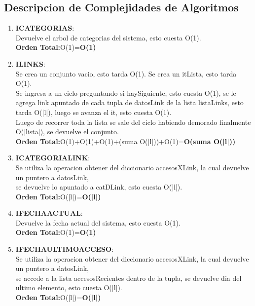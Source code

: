 \documentclass[10pt, a4paper]{article}
\begin{document}
\subsection{\huge Descripcion de Complejidades de Algoritmos}	
  
    \begin{enumerate}
     \item \textbf{ICATEGORIAS}: \\ Devuelve el arbol de categorias del sistema, esto cuesta O(1). \\
      \textbf{Orden Total:}O(1)=\textbf{O(1)}

     \item \textbf{ILINKS}:\\ Se crea un conjunto vacio, esto tarda O(1). Se crea un itLista, esto tarda O(1). \\ Se ingresa a un ciclo preguntando si haySiguiente, esto cuesta O(1), se le agrega link apuntado de cada tupla de datosLink de la lista listaLinks, esto tarda O(|l|), luego se avanza el it, esto cuesta O(1).\\ Luego de recorrer toda la lista se sale del ciclo habiendo demorado finalmente O(|lista|), se devuelve el conjunto. \\
	\textbf{Orden Total:}O(1)+O(1)+O(1)+(suma O(|l|))+O(1)=\textbf{O(suma O(|l|))}

     \item \textbf{ICATEGORIALINK}:\\ Se utiliza la operacion obtener del diccionario accesosXLink, la cual devuelve un puntero a datosLink,\\ se devuelve lo apuntado a catDLink, esto cuesta O(|l|). \\
	  \textbf{Orden Total:}O(|l|)=\textbf{O(|l|)}

      \item \textbf{IFECHAACTUAL}:\\ Devuelve la fecha actual del sistema, esto cuesta O(1). \\
	  \textbf{Orden Total:}O(1)=\textbf{O(1)}

     \item \textbf{IFECHAULTIMOACCESO}:\\ Se utiliza la operacion obtener del diccionario accesosXLink, la cual devuelve un puntero a datosLink,\\ se accede a la lista accesosRecientes dentro de la tupla, se devuelve dia del ultimo elemento, esto cuesta O(|l|). \\
	  \textbf{Orden Total:}O(|l|)=\textbf{O(|l|)}


\end{enumerate}
\end{document}
